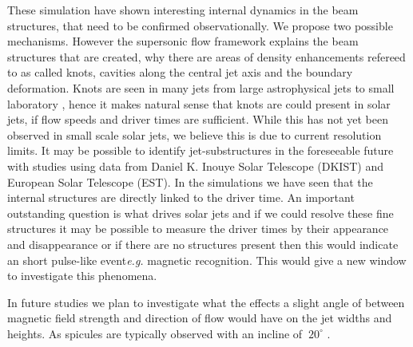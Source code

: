 \documentclass[12pt]{ociamthesis}
\begin{document}
These simulation have shown interesting internal dynamics in the beam structures, that need to be confirmed observationally. We propose two possible mechanisms. However the supersonic flow framework explains the beam structures that are created, why there are areas of density enhancements refereed to as called knots, cavities along the central jet axis and the boundary deformation. Knots are seen in many jets from large astrophysical jets \citep{van_Putten_1996ApJ467L57V, DeGouveiaDalPino2005, Hada2013ApJ77570H, Cohen2014ApJ787151C, Hervet2017AnA606A103H} to small laboratory \citep{Menon2010, Edgington-Mitchell2014, Ono2014}, hence it makes natural sense that knots are could present in solar jets, if flow speeds and driver times are sufficient. While this has not yet been observed in small scale solar jets, we believe this is due to current resolution limits. It may be possible to identify jet-substructures in the foreseeable future with studies using data from Daniel K. Inouye Solar Telescope (DKIST) and European Solar Telescope (EST). In the simulations we have seen that the internal structures are directly linked to the driver time. An important outstanding question is what drives solar jets and if we could resolve these fine structures it may be possible to measure the driver times by their appearance and disappearance or if there are no structures present then this would indicate an short pulse-like event\textit{e.g.} magnetic recognition. This would give a new window to investigate this phenomena.

In future studies we plan to investigate what the effects a slight angle of between magnetic field strength and direction of flow would have on the jet widths and heights. As spicules are typically observed with an incline of $~20^{\circ}$ \citep{Tavabi2012JMPh31786T}.  
\end{document}
